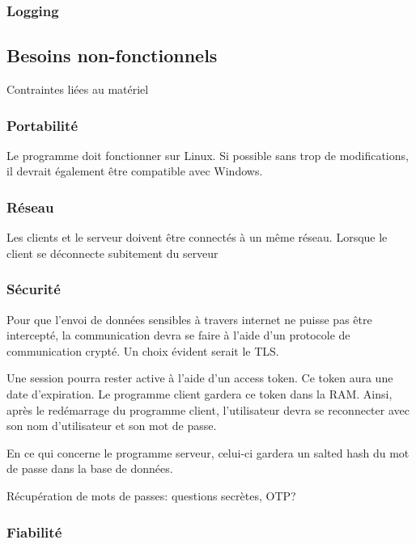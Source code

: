 \documentclass[french, utf8]{article}
\begin{document}
\subsubsection{Logging}


\newpage
\subsection{Besoins non-fonctionnels}
Contraintes liées au matériel

\subsubsection{Portabilité}

Le programme doit fonctionner sur Linux. Si possible sans trop de modifications, il devrait également être compatible avec Windows.

\subsubsection{Réseau}

Les clients et le serveur doivent être connectés à un même réseau. Lorsque le client se déconnecte subitement du serveur

\subsubsection{Sécurité}

Pour que l'envoi de données sensibles à travers internet ne puisse pas être intercepté, la communication devra se faire à l'aide d'un protocole de communication crypté. Un choix évident serait le TLS.

Une session pourra rester active à l'aide d'un access token.
Ce token aura une date d'expiration. Le programme client gardera ce token dans la RAM.
Ainsi, après le redémarrage du programme client, l'utilisateur devra se reconnecter avec son nom d'utilisateur et son mot de passe.


En ce qui concerne le programme serveur, celui-ci gardera un salted hash du mot de passe dans la base de données.

Récupération de mots de passes: questions secrètes, OTP?

\subsubsection{Fiabilité}
\end{document}
